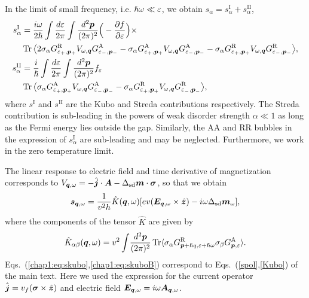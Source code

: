 In the limit of small frequency, i.e. $\hslash\omega\ll\varepsilon$, we obtain $s_\alpha = s^\text{I}_\alpha+s^\text{II}_\alpha$,
\begin{align}
    s^\text{I}_\alpha&=\frac{i\omega}{2\hslash}\int\frac{d\varepsilon}{2\pi}\int \frac{d^2\boldsymbol{p}}{(2\pi)^2}\Big(-\frac{\partial f}{\partial \varepsilon}\Big)\times\nonumber\\
    &\operatorname{Tr}\big\langle
    2\sigma_\alpha G^\text{R}_{\varepsilon_+,\boldsymbol{p}_+} V_{\omega,\boldsymbol{q}} G^\text{A}_{\varepsilon_-,\boldsymbol{p}_-}-\sigma_\alpha G^\text{A}_{\varepsilon_+,\boldsymbol{p}_+} V_{\omega,\boldsymbol{q}} G^\text{A}_{\varepsilon_-,\boldsymbol{p}_-} 
    -\sigma_\alpha G^\text{R}_{\varepsilon_+,\boldsymbol{p}_+} V_{\omega,\boldsymbol{q}} G^\text{R}_{\varepsilon_-,\boldsymbol{p}_-}\big\rangle,\\
    s^\text{II}_\alpha&=\frac{i}{\hslash}\int\frac{d\varepsilon}{2\pi}\int \frac{d^2\boldsymbol{p}}{(2\pi)^2} f_\varepsilon\\
     &\operatorname{Tr} \big\langle\sigma_\alpha
    G^\text{A}_{\varepsilon_+,\boldsymbol{p}_+} V_{\omega,\boldsymbol{q}} G^\text{A}_{\varepsilon_-,\boldsymbol{p}_-}-
    \sigma_\alpha G^\text{R}_{\varepsilon_+,\boldsymbol{p}_+} V_{\omega,\boldsymbol{q}} G^\text{R}_{\varepsilon_-,\boldsymbol{p}_-}\big\rangle,
\end{align}
where $s^{\text{I}}$ and $s^\text{II}$ are the Kubo and Streda contributions respectively. The Streda contribution is sub-leading in the powers of weak disorder strength $\alpha\ll 1$ as long as the Fermi energy lies outside the gap. Similarly, the AA and RR bubbles in the expression of $s_\alpha^\text{I}$ are sub-leading and may be neglected. Furthermore, we work in the zero temperature limit. 

The linear response to electric field and time derivative of magnetization corresponds to $V_{\boldsymbol{q},\omega} = -\hat{\boldsymbol{j}}
\cdot\boldsymbol{A}-\Delta_\text{sd} \boldsymbol{m}\cdot\boldsymbol{\sigma}$, so that we obtain
\begin{equation}
  \boldsymbol{s}_{\boldsymbol{q},\omega}=\frac{1}{v^2h}\hat{K}(\boldsymbol{q},\omega)[ev(\boldsymbol{E}_{\boldsymbol{q},\omega}\times\hat{\boldsymbol{z}})-i\omega\Delta_{\text{sd}}\boldsymbol{m}_{\omega}],
  \label{chap1:eq:skubo}
\end{equation}
where the components of the tensor $\hat{K}$ are given by
\begin{equation}
\hat{K}_{\alpha\beta}(\boldsymbol{q},\omega)={v^2}\int\!\frac{d^2\boldsymbol{p}}{(2\pi)^2}\operatorname{Tr} \langle \sigma_\alpha G^\text{R}_{\boldsymbol{p}+ \hslash q,\varepsilon+\hslash\omega}\sigma_\beta G^\text{A}_{\boldsymbol{p},\varepsilon}\rangle.
\label{chap1:eq:skuboB}
\end{equation}
Eqs.~(\ref{chap1:eq:skubo},\ref{chap1:eq:skuboB}) correspond to Eqs.~(\ref{spol},\ref{Kubo}) of the main text. Here we used the expression for the current operator $\hat{\boldsymbol{j}} = v_f(\boldsymbol{\sigma}\times\hat{\boldsymbol{z}})$ and electric field $\boldsymbol{E}_{\boldsymbol{q},\omega}=i\omega \boldsymbol{A}_{\boldsymbol{q},\omega}$.

